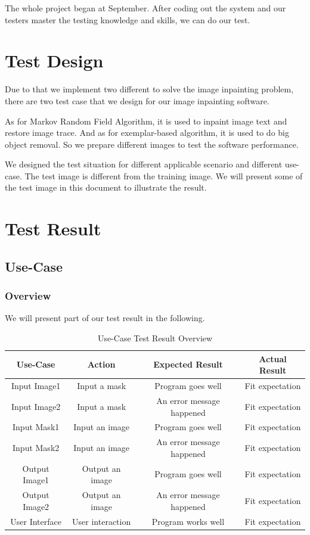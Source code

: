 \documentclass[12pt]{article}
\begin{document}
The whole project began at September. After coding out the system and our testers master the testing knowledge and skills, we can do our test. 

\section{Test Design}
\qquad Due to that we implement two different to solve the image inpainting problem, there are two test case that we design for our image inpainting software.

As for Markov Random Field Algorithm, it is used to inpaint image text and restore image trace. And as for exemplar-based algorithm, it is used to do big object removal. So we prepare different images to test the software performance. 

We designed the test situation for different applicable scenario and different use-case. The test image is different from the training image. We will present some of the test image in this document to illustrate the result.

\section{Test Result}
\subsection{Use-Case}
\subsubsection*{Overview}
\qquad We will present part of our test result in the following.
\begin{table}[H]
	\centering
	\begin{tabular}{|c|c|c|c|}
		\hline
		Use-Case & Action & Expected Result& Actual Result\\
		\hline
		Input Image1 & Input a mask & Program goes well& Fit expectation\\
		\hline
		Input Image2 & Input a mask & An error message happened & Fit expectation\\
		\hline
		Input Mask1 & Input an image & Program goes well& Fit expectation\\
		\hline
		Input Mask2 & Input an image & An error message happened& Fit expectation\\
		\hline
		Output Image1 & Output an image & Program goes well& Fit expectation\\
		\hline
		Output Image2 & Output an image & An error message happened& Fit expectation\\
		\hline
		User Interface & User interaction & Program works well& Fit expectation\\
		\hline
	\end{tabular}
	\caption{Use-Case Test Result Overview}
\end{table}
\end{document}
